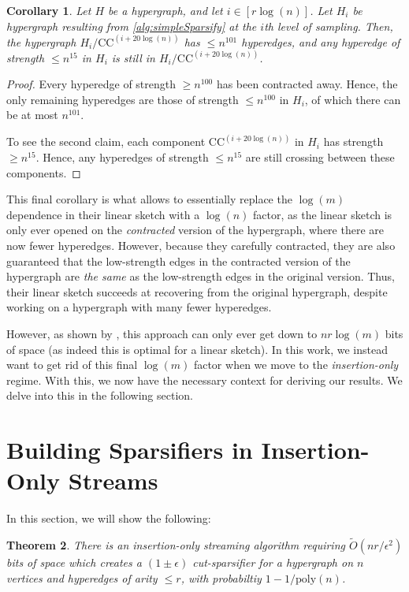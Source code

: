 \documentclass[11pt]{article}
\newtheorem{theorem}{Theorem}[section]
\newtheorem{corollary}[theorem]{Corollary}
\theoremstyle{definition}
\newcommand{\eps}{\epsilon}
\begin{document}
\begin{corollary}\label{cor:boundedHyperedges}
	Let $H$ be a hypergraph, and let $i \in [r \log(n)]$. Let $H_i$ be hypergraph resulting from \cref{alg:simpleSparsify} at the $i$th level of sampling. Then, the hypergraph $H_i /  \mathrm{CC}^{(i + 20 \log(n))}$ has $\leq n^{101}$ hyperedges, and any hyperedge of strength $\leq n^{15}$ in $H_i$ is still in $H_i /  \mathrm{CC}^{(i + 20 \log(n))}$.
\end{corollary}

\begin{proof}
	Every hyperedge of strength $\geq n^{100}$ has been contracted away. Hence, the only remaining hyperedges are those of strength $\leq n^{100}$ in $H_i$, of which there can be at most $n^{101}$.
	
	To see the second claim, each component $\mathrm{CC}^{(i + 20 \log(n))}$ in $H_i$ has strength $\geq n^{15}$. Hence, any hyperedges of strength $\leq n^{15}$ are still crossing between these components. 
\end{proof}

This final corollary is what allows \cite{KPS24d} to essentially replace the $\log(m)$ dependence in their linear sketch with a $\log(n)$ factor, as the linear sketch is only ever opened on the \emph{contracted} version of the hypergraph, where there are now fewer hyperedges. However, because they carefully contracted, they are also guaranteed that the low-strength edges in the contracted version of the hypergraph are \emph{the same} as the low-strength edges in the original version. Thus, their linear sketch succeeds at recovering from the original hypergraph, despite working on a hypergraph with many fewer hyperedges.

However, as shown by \cite{KPS24d}, this approach can only ever get down to $nr \log(m)$ bits of space (as indeed this is optimal for a linear sketch).
In this work, we instead want to get rid of this final $\log(m)$ factor when we move to the \emph{insertion-only} regime. With this, we now have the necessary context for deriving our results. We delve into this in the following section.
	
\section{Building Sparsifiers in Insertion-Only Streams}\label{sec:insertion}


In this section, we will show the following:

\begin{theorem}\label{thm:insertionOnly}
	There is an insertion-only streaming algorithm requiring $\widetilde{O}(n r / \eps^2)$ bits of space which creates a $(1 \pm \eps)$ cut-sparsifier for a hypergraph on $n$ vertices and hyperedges of arity $\leq r$, with probabiltiy $1 - 1 / \mathrm{poly}(n)$.
\end{theorem}
\end{document}
